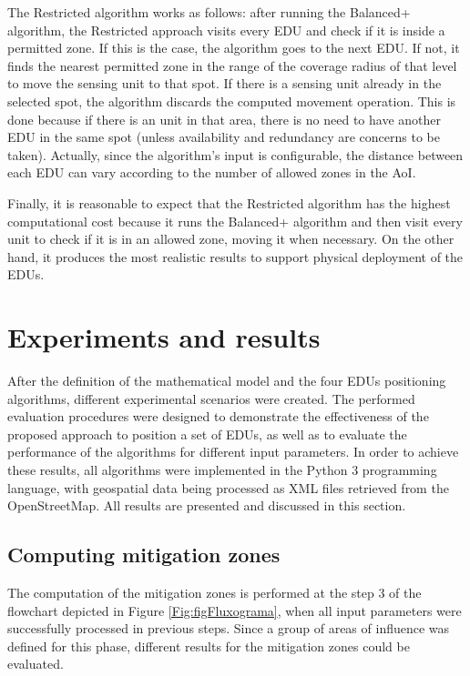 \begin{refsection}
The Restricted algorithm works as follows: after running the Balanced+ algorithm, the Restricted approach visits every EDU and check if it is inside a permitted zone. If this is the case, the algorithm goes to the next EDU. If not, it finds the nearest permitted zone in the range of the coverage radius of that level to move the sensing unit to that spot. If there is a sensing unit already in the selected spot, the algorithm discards the computed movement operation. This is done because if there is an unit in that area, there is no need to have another EDU in the same spot (unless availability and redundancy are concerns to be taken). Actually, since the algorithm's input is configurable, the distance between each EDU can vary according to the number of allowed zones in the AoI. 

Finally, it is reasonable to expect that the Restricted algorithm has the highest computational cost because it runs the Balanced+ algorithm and then visit every unit to check if it is in an allowed zone, moving it when necessary. On the other hand, it produces the most realistic results to support physical deployment of the EDUs.

\section{Experiments and results}\label{S:5}

After the definition of the mathematical model and the four EDUs positioning algorithms, different experimental scenarios were created. The performed evaluation procedures were designed to demonstrate the effectiveness of the proposed approach to position a set of EDUs, as well as to evaluate the performance of the algorithms for different input parameters. In order to achieve these results, all algorithms were implemented in the Python 3 programming language, with geospatial data being processed as XML files retrieved from the OpenStreetMap. All results are presented and discussed in this section.

\subsection{Computing mitigation zones}

The computation of the mitigation zones is performed at the step 3 of the flowchart depicted in Figure \ref{Fig:figFluxograma}, when all input parameters were successfully processed in previous steps. Since a group of areas of influence was defined for this phase, different results for the mitigation zones could be evaluated. 


\end{refsection}
